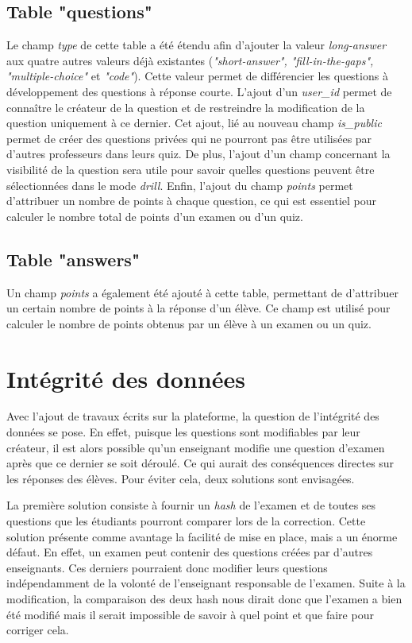 \subsection{Table "questions"}
Le champ \emph{type} de cette table a été étendu afin d'ajouter la valeur \emph{long-answer} aux quatre autres valeurs déjà existantes (\emph{"short-answer", "fill-in-the-gaps", "multiple-choice"} et \emph{"code"}). Cette valeur permet de différencier les questions à développement des questions à réponse courte. L'ajout d'un \emph{user\_id} permet de connaître le créateur de la question et de restreindre la modification de la question uniquement à ce dernier. Cet ajout, lié au nouveau champ \emph{is\_public} permet de créer des questions privées qui ne pourront pas être utilisées par d'autres professeurs dans leurs quiz. De plus, l'ajout d'un champ concernant la visibilité de la question sera utile pour savoir quelles questions peuvent être sélectionnées dans le mode \emph{drill}. Enfin, l'ajout du champ \emph{points} permet d'attribuer un nombre de points à chaque question, ce qui est essentiel pour calculer le nombre total de points d'un examen ou d'un quiz.

\subsection{Table "answers"}
Un champ \emph{points} a également été ajouté à cette table, permettant de d'attribuer un certain nombre de points à la réponse d'un élève. Ce champ est utilisé pour calculer le nombre de points obtenus par un élève à un examen ou un quiz.

\section{Intégrité des données}
Avec l'ajout de travaux écrits sur la plateforme, la question de l'intégrité des données se pose. En effet, puisque les questions sont modifiables par leur créateur, il est alors possible qu'un enseignant modifie une question d'examen après que ce dernier se soit déroulé. Ce qui aurait des conséquences directes sur les réponses des élèves. Pour éviter cela, deux solutions sont envisagées.

La première solution consiste à fournir un \emph{hash} de l'examen et de toutes ses questions que les étudiants pourront comparer lors de la correction. Cette solution présente comme avantage la facilité de mise en place, mais a un énorme défaut. En effet, un examen peut contenir des questions créées par d'autres enseignants. Ces derniers pourraient donc modifier leurs questions indépendamment de la volonté de l'enseignant responsable de l'examen. Suite à la modification, la comparaison des deux hash nous dirait donc que l'examen a bien été modifié mais il serait impossible de savoir à quel point et que faire pour corriger cela.

